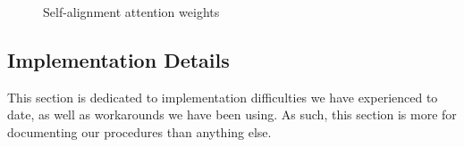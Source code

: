 \documentclass{article}
\begin{document}
\begin{figure}[!h]
	\centering
	\qquad
	\caption{Self-alignment attention weights}
	\label{fig:heatMaps2}
\end{figure}

\subsection{Implementation Details}
This section is dedicated to implementation difficulties we have experienced to date, as well as workarounds we have been using. As such, this section is more for documenting our procedures than anything else. 
\end{document}
